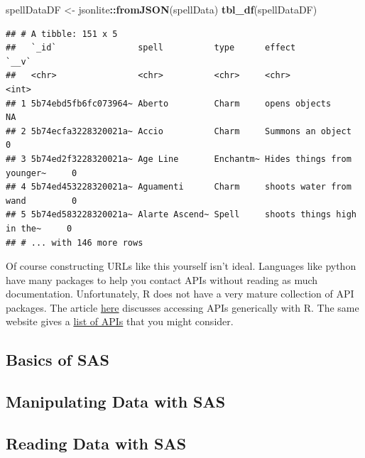 \documentclass[
]{book}
\newenvironment{Shaded}{\begin{snugshade}}{\end{snugshade}}
\newcommand{\KeywordTok}[1]{\textcolor[rgb]{0.13,0.29,0.53}{\textbf{#1}}}
\newcommand{\NormalTok}[1]{#1}
\newcommand{\OperatorTok}[1]{\textcolor[rgb]{0.81,0.36,0.00}{\textbf{#1}}}
\newcommand{\StringTok}[1]{\textcolor[rgb]{0.31,0.60,0.02}{#1}}
\theoremstyle{definition}
\theoremstyle{definition}
\theoremstyle{definition}
\theoremstyle{remark}
\begin{document}
\begin{Shaded}
\begin{Highlighting}[]
\NormalTok{spellDataDF <-}\StringTok{ }\NormalTok{jsonlite}\OperatorTok{::}\KeywordTok{fromJSON}\NormalTok{(spellData)}
\KeywordTok{tbl_df}\NormalTok{(spellDataDF)}
\end{Highlighting}
\end{Shaded}

\begin{verbatim}
## # A tibble: 151 x 5
##   `_id`                spell          type      effect                     `__v`
##   <chr>                <chr>          <chr>     <chr>                      <int>
## 1 5b74ebd5fb6fc073964~ Aberto         Charm     opens objects                 NA
## 2 5b74ecfa3228320021a~ Accio          Charm     Summons an object              0
## 3 5b74ed2f3228320021a~ Age Line       Enchantm~ Hides things from younger~     0
## 4 5b74ed453228320021a~ Aguamenti      Charm     shoots water from wand         0
## 5 5b74ed583228320021a~ Alarte Ascend~ Spell     shoots things high in the~     0
## # ... with 146 more rows
\end{verbatim}

Of course constructing URLs like this yourself isn't ideal. Languages like python have many packages to help you contact APIs without reading as much documentation. Unfortunately, R does not have a very mature collection of API packages. The article \href{https://www.programmableweb.com/news/how-to-access-any-restful-api-using-r-language/how-to/2017/07/21}{here} discusses accessing APIs generically with R. The same website gives a \href{https://www.programmableweb.com/category/all/apis}{list of APIs} that you might consider.

\hypertarget{basics-of-sas-1}{%
\subsection{Basics of SAS}\label{basics-of-sas-1}}

\hypertarget{manipulating-data-with-sas-1}{%
\subsection{Manipulating Data with SAS}\label{manipulating-data-with-sas-1}}

\hypertarget{reading-data-with-sas-1}{%
\subsection{Reading Data with SAS}\label{reading-data-with-sas-1}}

  
\end{document}
